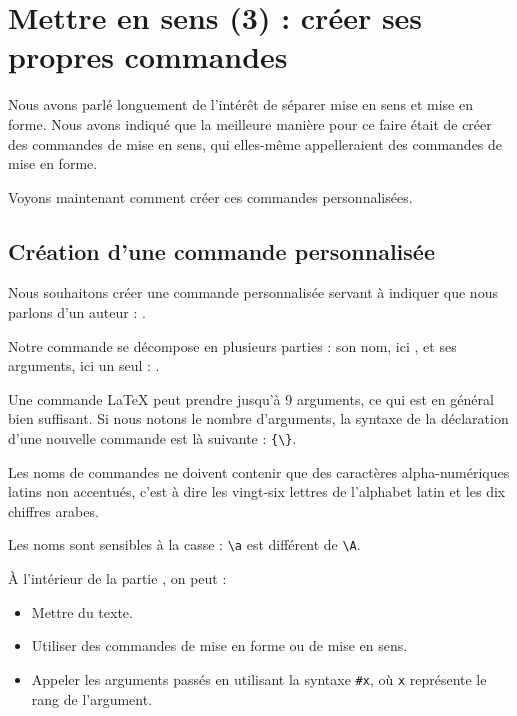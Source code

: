 \chapter{Mettre en sens (3) : créer ses propres commandes}\label{creercommandes}

\begin{prealable}
Nous avons parlé longuement de l'intérêt de séparer mise en sens et mise en forme.
Nous avons indiqué que la meilleure manière pour ce faire était de créer des commandes de mise en sens, qui elles-même appelleraient des commandes de mise en forme.

Voyons maintenant comment créer ces commandes personnalisées.
\end{prealable}

\section{Création d'une commande personnalisée}

Nous souhaitons créer une commande personnalisée servant à indiquer que nous parlons d'un auteur : .

Notre commande se décompose en plusieurs parties : son nom, ici , et ses arguments, ici un seul : .

Une commande LaTeX peut prendre jusqu'à 9 arguments, ce qui est en général bien suffisant. Si nous notons  le nombre d'arguments, la syntaxe de la déclaration d'une nouvelle commande est là suivante :
\verb|{\|\verb|}|.

\begin{attention}
    Les noms de commandes ne doivent contenir que des caractères alpha-numériques latins non accentués, c'est à dire les vingt-six lettres de l'alphabet latin et les dix chiffres arabes. 
    
    Les noms sont sensibles à la casse : \verb|\a| est différent de \verb|\A|.
\end{attention}
À l'intérieur de la partie , on peut  :
\begin{itemize}
    \item Mettre du texte.
    \item Utiliser des commandes de mise en forme ou de mise en sens.
    \item Appeler les arguments passés en utilisant la syntaxe \verb|#x|, où \verb|x| représente le rang de l'argument.
\end{itemize}

